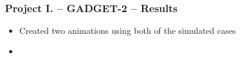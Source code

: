 \begin{frame}
\frametitle{Project I. -- GADGET-2 -- Results}
\begin{itemize}
	\item Created two animations using both of the simulated cases
	\item 
\end{itemize}

\end{frame}